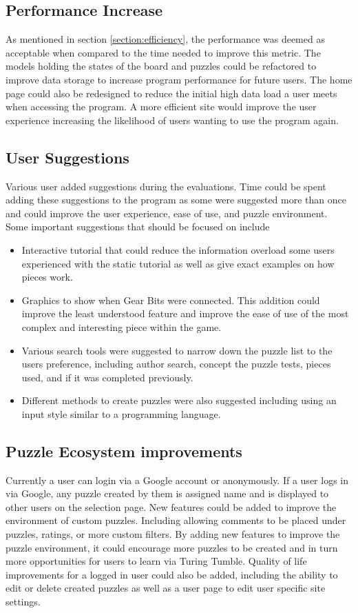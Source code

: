 \documentclass{l4proj}
\begin{document}
\subsection{Performance Increase}
As mentioned in section \ref{section:efficiency}, the performance was deemed as acceptable when compared to the time needed to improve this metric. The models holding the states of the board and puzzles could be refactored to improve data storage to increase program performance for future users. The home page could also be redesigned to reduce the initial high data load a user meets when accessing the program. A more efficient site would improve the user experience increasing the likelihood of users wanting to use the program again. 

\subsection{User Suggestions}
Various user added suggestions during the evaluations. Time could be spent adding these suggestions to the program as some were suggested more than once and could improve the user experience, ease of use, and puzzle environment. Some important suggestions that should be focused on include 
\begin{itemize}
    \item Interactive tutorial that could reduce the information overload some users experienced with the static tutorial as well as give exact examples on how pieces work.
    \item Graphics to show when Gear Bits were connected. This addition could improve the least understood feature and improve the ease of use of the most complex and interesting piece within the game.
    \item Various search tools were suggested to narrow down the puzzle list to the users preference, including author search, concept the puzzle tests, pieces used, and if it was completed previously.
    \item Different methods to create puzzles were also suggested including using an input style similar to a programming language.
\end{itemize}


\subsection{Puzzle Ecosystem improvements}
Currently a user can login via a Google account or anonymously. If a user logs in via Google, any puzzle created by them is assigned name and is displayed to other users on the selection page. New features could be added to improve the environment of custom puzzles. Including allowing comments to be placed under puzzles, ratings, or more custom filters. By adding new features to improve the puzzle environment, it could encourage more puzzles to be created and in turn more opportunities for users to learn via Turing Tumble. Quality of life improvements for a logged in user could also be added, including the ability to edit or delete created puzzles as well as a user page to edit user specific site settings.
\end{document}
